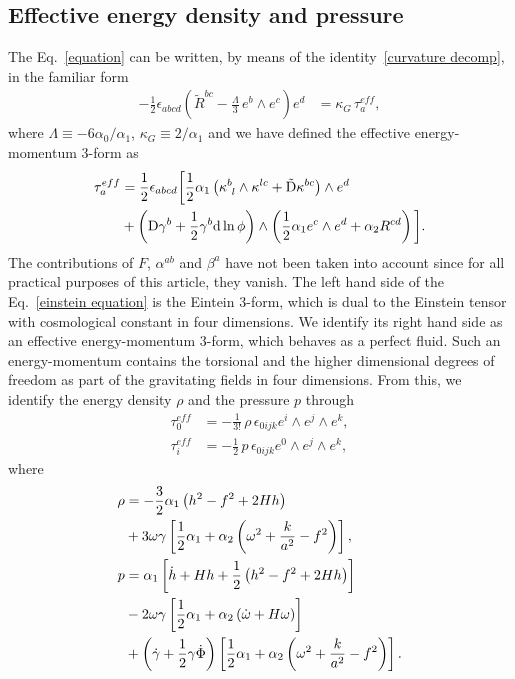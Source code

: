 \documentclass[aps,prd,12pt,superscriptaddress,showpacs,showkeys,longbibliography,reprint,nofootinbib]{revtex4-1}
\begin{document}
\subsection{Effective energy density and pressure}

The Eq.~\eqref{equation} can be written, by means of the identity~\eqref{curvature decomp}, in the familiar form
\begin{align}\label{einstein equation}
  -\frac{1}{2}\epsilon_{abcd}\left(\tilde{R}^{bc} - \frac{\Lambda}{3}\,e^b\wedge e^c\right)e^d &= \kappa_{G}\,\tau^{eff}_a,
\end{align}
where $\Lambda \equiv -6\alpha_0/\alpha_1$, $\kappa_{G} \equiv 2/\alpha_1$ and we have defined the effective energy-momentum $3$-form as
\begin{align}
  \tau_a^{eff}&= \frac{1}{2}\epsilon_{abcd}\bigg[\frac{1}{2}\alpha_1\left(\kappa^b_{\ l}\wedge\kappa^{lc}+\tilde{\text{D}}\kappa^{bc}\right)\wedge e^d\notag\\
    &+\left(\text{D}\gamma^b+\frac{1}{2}\gamma^b\text{d}\ln\phi\right)\wedge\left(\frac{1}{2}\alpha_1e^c\wedge e^d+\alpha_2R^{cd}\right)\bigg].
\end{align}
The contributions of $F$, $\alpha^{ab}$ and $\beta^a$ have not been taken into account since for all practical purposes of this article, they vanish. The left hand side of the Eq.~\eqref{einstein equation} is the Eintein $3$-form, which is dual to the Einstein tensor with cosmological constant in four dimensions. We identify its right hand side as an effective energy-momentum $3$-form, which behaves as a perfect fluid. Such an energy-momentum contains the torsional and the higher dimensional degrees of freedom as part of the gravitating fields in four dimensions. From this, we identify the energy density $\rho$ and the pressure $p$ through
\begin{align}
  \tau_0^{eff}&=-\frac{1}{3!}\,\rho\,\epsilon_{0ijk}e^i\wedge e^j\wedge e^k,\\
  \tau_i^{eff}&=-\frac{1}{2}\,p\,\epsilon_{0ijk}e^0\wedge e^j\wedge e^k,
\end{align} 
where
\begin{align}\label{rho}
  \rho&=-\frac{3}{2}\alpha_1\left(h^2-f^2+2Hh\right)\notag\\
  &+3\omega\gamma\left[\frac{1}{2}\alpha_1+\alpha_2\left(\omega^2+\frac{k}{a^2}-f^2\right)\right],\\
  \label{presion}
  p&=\alpha_1\left[\dot{h}+Hh+\frac{1}{2}\left(h^2-f^2+2Hh\right)\right]\notag\\
  &-2\omega\gamma\left[\frac{1}{2}\alpha_1+\alpha_2\left(\dot{\omega}+H\omega\right)\right]\notag\\
  &+\left(\dot{\gamma}+\frac{1}{2}\gamma\dot{\Phi}\right)\left[\frac{1}{2}\alpha_1+\alpha_2\left(\omega^2+\frac{k}{a^2}-f^2\right)\right].
\end{align}
\end{document}
